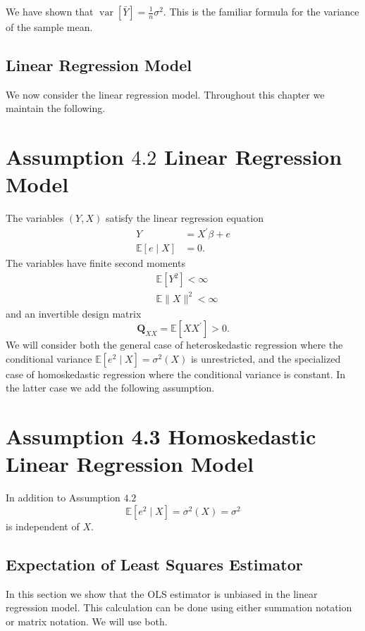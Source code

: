 \documentclass[10pt]{article}
\begin{document}
We have shown that $\operatorname{var}[\bar{Y}]=\frac{1}{n} \sigma^{2}$. This is the familiar formula for the variance of the sample mean.

\subsection{Linear Regression Model}
We now consider the linear regression model. Throughout this chapter we maintain the following.

\section{Assumption $4.2$ Linear Regression Model}
The variables $(Y, X)$ satisfy the linear regression equation
$$
\begin{aligned}
Y &=X^{\prime} \beta+e \\
\mathbb{E}[e \mid X] &=0 .
\end{aligned}
$$
The variables have finite second moments
$$
\begin{aligned}
&\mathbb{E}\left[Y^{2}\right]<\infty \\
&\mathbb{E}\|X\|^{2}<\infty
\end{aligned}
$$
and an invertible design matrix
$$
\boldsymbol{Q}_{X X}=\mathbb{E}\left[X X^{\prime}\right]>0 .
$$
We will consider both the general case of heteroskedastic regression where the conditional variance $\mathbb{E}\left[e^{2} \mid X\right]=\sigma^{2}(X)$ is unrestricted, and the specialized case of homoskedastic regression where the conditional variance is constant. In the latter case we add the following assumption.

\section{Assumption 4.3 Homoskedastic Linear Regression Model}
In addition to Assumption $4.2$
$$
\mathbb{E}\left[e^{2} \mid X\right]=\sigma^{2}(X)=\sigma^{2}
$$
is independent of $X$.

\subsection{Expectation of Least Squares Estimator}
In this section we show that the OLS estimator is unbiased in the linear regression model. This calculation can be done using either summation notation or matrix notation. We will use both.
\end{document}
